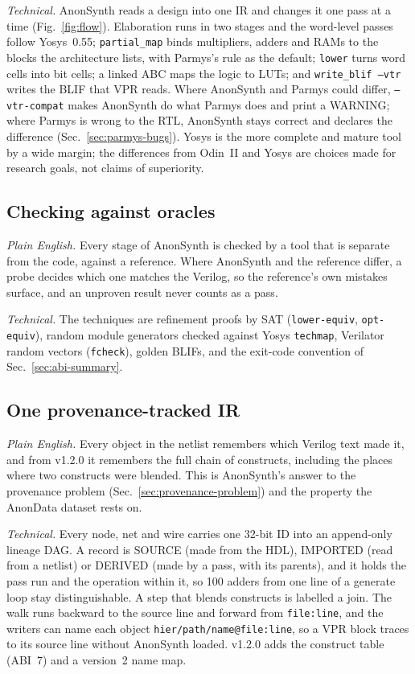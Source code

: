 \documentclass[conference]{IEEEtran}
\newcommand{\code}[1]{\texttt{#1}}
\begin{document}
\emph{Technical.} AnonSynth reads a design into one IR and changes it one pass at a time (Fig.~\ref{fig:flow}). Elaboration runs in two stages and the word-level passes follow Yosys~0.55; \code{partial\_map} binds multipliers, adders and RAMs to the blocks the architecture lists, with Parmys's rule as the default; \code{lower} turns word cells into bit cells; a linked ABC maps the logic to LUTs; and \code{write\_blif --vtr} writes the BLIF that VPR reads. Where AnonSynth and Parmys could differ, \code{--vtr-compat} makes AnonSynth do what Parmys does and print a WARNING; where Parmys is wrong to the RTL, AnonSynth stays correct and declares the difference (Sec.~\ref{sec:parmys-bugs}). Yosys is the more complete and mature tool by a wide margin; the differences from Odin~II and Yosys are choices made for research goals, not claims of superiority.

\subsection{Checking against oracles}

\emph{Plain English.} Every stage of AnonSynth is checked by a tool that is separate from the code, against a reference. Where AnonSynth and the reference differ, a probe decides which one matches the Verilog, so the reference's own mistakes surface, and an unproven result never counts as a pass.

\emph{Technical.} The techniques are refinement proofs by SAT (\code{lower-equiv}, \code{opt-equiv}), random module generators checked against Yosys \code{techmap}, Verilator random vectors (\code{fcheck}), golden BLIFs, and the exit-code convention of Sec.~\ref{sec:abi-summary}.

\subsection{One provenance-tracked IR}

\emph{Plain English.} Every object in the netlist remembers which Verilog text made it, and from v1.2.0 it remembers the full chain of constructs, including the places where two constructs were blended. This is AnonSynth's answer to the provenance problem (Sec.~\ref{sec:provenance-problem}) and the property the AnonData dataset rests on.

\emph{Technical.} Every node, net and wire carries one 32-bit ID into an append-only lineage DAG. A record is SOURCE (made from the HDL), IMPORTED (read from a netlist) or DERIVED (made by a pass, with its parents), and it holds the pass run and the operation within it, so 100 adders from one line of a generate loop stay distinguishable. A step that blends constructs is labelled a join. The walk runs backward to the source line and forward from \code{file:line}, and the writers can name each object \code{hier/path/name@file:line}, so a VPR block traces to its source line without AnonSynth loaded. v1.2.0 adds the construct table (ABI~7) and a version~2 name map.
\end{document}
